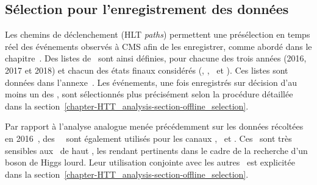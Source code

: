 \subsection{Sélection pour l'enregistrement des données}\label{chapter-HTT_analysis-section-triggers}
Les chemins de déclenchement (HLT \emph{paths}) permettent une présélection en temps réel des événements observés à CMS afin de les enregistrer, comme abordé dans le chapitre~.
Des listes de \HLTpaths\ sont ainsi définies, pour chacune des trois années (2016, 2017 et 2018) et chacun des états finaux considérés (\tauh\tauh, \mu\tauh, \ele\tauh\ et \ele\mu).
Ces listes sont données dans l'annexe~.
Les événements, une fois enregistrés sur décision d'au moins un des \HLTpaths, sont sélectionnés plus précisément selon la procédure détaillée dans la section~\ref{chapter-HTT_analysis-section-offline_selection}.
\par
Par rapport à l'analyse analogue menée précédemment sur les données récoltées en 2016~\cite{CMS-PAS-HIG-17-020}, des \HLTpaths\ \HLTSingleTau\ sont également utilisés pour les canaux \tauh\tauh, \mu\tauh\ et \ele\tauh.
Ces \HLTpaths\ sont très sensibles aux \tauh\ de haut \pT, les rendant pertinents dans le cadre de la recherche d'un boson de Higgs lourd.
Leur utilisation conjointe avec les autres \HLTpaths\ est explicitée dans la section~\ref{chapter-HTT_analysis-section-offline_selection}.

%
%

